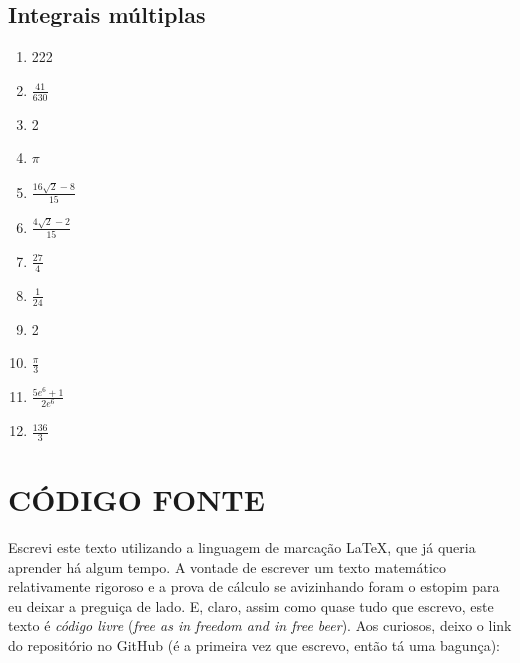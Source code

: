 \documentclass[a4paper, 12pt]{extreport}
\newcommand{\latex}{\LaTeX{}}
\begin{document}
    \section*{Integrais múltiplas}
      \begin{multicols}{4}
        \begin{enumerate}
          \item 222
          \item $\frac{41}{630}$
          \item 2
          \item $\pi$
          \item $\frac{16\sqrt{2}-8}{15}$
          \item $\frac{4\sqrt{2}-2}{15}$
          \item $\frac{27}{4}$
          \item $\frac{1}{24}$
          \item 2
          \item $\frac{\pi}{3}$
          \item $\frac{5e^6+1}{2e^6}$
          \item $\frac{136}{3}$
        \end{enumerate}
      \end{multicols}

  \chapter{\texorpdfstring{CÓDIGO FONTE}{TEXT}{}}
    Escrevi este texto utilizando a linguagem de marcação \latex, que já queria aprender há algum tempo. A vontade de escrever
    um texto matemático relativamente rigoroso e a prova de cálculo se avizinhando foram o estopim para eu deixar a preguiça de lado.
    E, claro, assim como quase tudo que escrevo, este texto é \textsl{código livre} (\textsl{free as in freedom and in free beer}).
    Aos curiosos, deixo o link do repositório no GitHub (é a primeira vez que escrevo, então tá uma bagunça): \url{}
\end{document}
